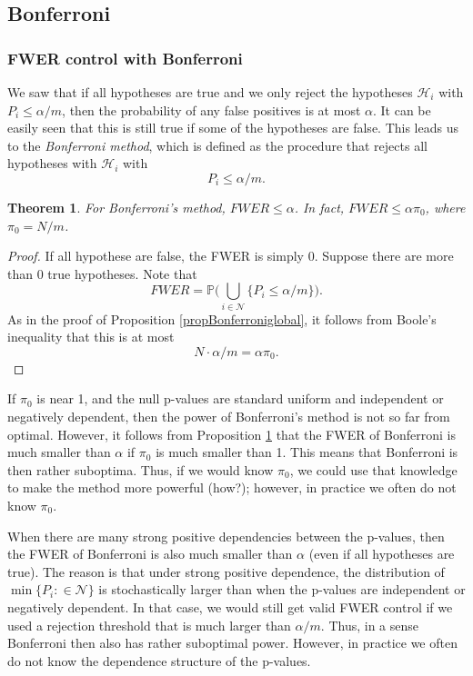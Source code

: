 \documentclass[11pt]{article}
\theoremstyle{plain}
\newtheorem{theorem}{Theorem}[section]
\theoremstyle{definition}
\newcommand{\N}{\mathcal{N}}
\newcommand{\Hy}{\mathcal{H}}
\newcommand{\pr}{\mathbb{P}}
\begin{document}
\subsection{Bonferroni} \label{secbonf}
\subsubsection{FWER control with Bonferroni}
We saw that if all hypotheses are true and we only reject the hypotheses $\Hy_i$ with $P_i\leq \alpha/m$, then the probability of any false positives is at most $\alpha$. It can be easily seen that this is still true if some of the hypotheses are false. This leads us to the \emph{Bonferroni method}, which is defined as the procedure that rejects all hypotheses with $\Hy_i$ with $$P_i\leq \alpha/m.$$

\begin{theorem} \label{propBonf}
For Bonferroni's method, $FWER\leq \alpha$. In fact,  $FWER\leq \alpha\pi_0$, where $\pi_0=N/m$.
\end{theorem}

\begin{proof}
If all hypothese are false, the FWER is simply 0.  Suppose there are more than 0 true hypotheses. 
Note that $$FWER = \pr\big(\bigcup_{i\in \N}\{P_i\leq \alpha/m\}\big).$$
As in the proof of Proposition \ref{propBonferroniglobal}, it follows from Boole's inequality that this is at most
$$N\cdot \alpha/m = \alpha\pi_0.$$
\end{proof}

 If $\pi_0$ is near 1, and the null p-values are standard uniform and independent or negatively dependent, then the power of Bonferroni's method is not so far from optimal. However, it follows from Proposition \ref{propBonf} that the FWER of Bonferroni is much smaller than $\alpha$ if $\pi_0$ is much smaller than 1. This means that Bonferroni is then rather suboptima. Thus, if we would know $\pi_0$, we could use that knowledge to make the method more powerful (how?); however, in practice we often do not know $\pi_0$. 
 
 When there are many strong positive dependencies between the p-values, then the FWER of Bonferroni is also much smaller than $\alpha$ (even if all hypotheses are true). The reason is that under strong positive dependence, the distribution of $\min\{P_i:\in \N\}$ is stochastically larger than when the p-values are independent or negatively dependent. In that case, we would still get valid FWER control if we used a rejection threshold that is much larger than $\alpha/m$. Thus, in a sense Bonferroni then also has rather suboptimal power. However, in practice we often do not know the dependence structure of the p-values. 
 
\end{document}
